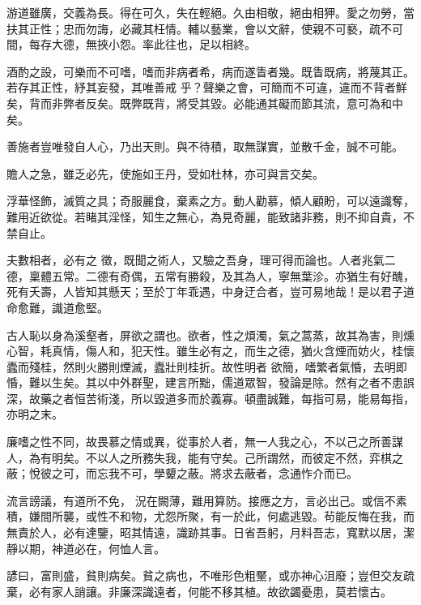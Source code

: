 \begin{pinyinscope}
 游道雖廣，交義為長。得在可久，失在輕絕。久由相敬，絕由相狎。愛之勿勞，當扶其正性；忠而勿誨，必藏其枉情。輔以藝業，會以文辭，使親不可褻，疏不可間，每存大德，無挾小怨。率此往也，足以相終。



 酒酌之設，可樂而不可嗜，嗜而非病者希，病而遂眚者幾。既眚既病，將蔑其正。若存其正性，紓其妄發，其唯善戒
 乎？聲樂之會，可簡而不可違，違而不背者鮮矣，背而非弊者反矣。既弊既背，將受其毀。必能通其礙而節其流，意可為和中矣。



 善施者豈唯發自人心，乃出天則。與不待積，取無謀實，並散千金，誠不可能。



 贍人之急，雖乏必先，使施如王丹，受如杜林，亦可與言交矣。



 浮華怪飾，滅質之具；奇服麗食，棄素之方。動人勸慕，傾人顧盼，可以遠識奪，難用近欲從。若睹其淫怪，知生之無心，為見奇麗，能致諸非務，則不抑自貴，不禁自止。



 夫數相者，必有之
 徵，既聞之術人，又驗之吾身，理可得而論也。人者兆氣二德，稟體五常。二德有奇偶，五常有勝殺，及其為人，寧無葉沴。亦猶生有好醜，死有夭壽，人皆知其懸天；至於丁年乖遇，中身迂合者，豈可易地哉！是以君子道命愈難，識道愈堅。



 古人恥以身為溪壑者，屏欲之謂也。欲者，性之煩濁，氣之蒿蒸，故其為害，則燻心智，耗真情，傷人和，犯天性。雖生必有之，而生之德，猶火含煙而妨火，桂懷蠹而殘桂，然則火勝則煙滅，蠹壯則桂折。故性明者
 欲簡，嗜繁者氣惛，去明即惛，難以生矣。其以中外群聖，建言所黜，儒道眾智，發論是除。然有之者不患誤深，故藥之者恒苦術淺，所以毀道多而於義寡。頓盡誠難，每指可易，能易每指，亦明之末。



 廉嗜之性不同，故畏慕之情或異，從事於人者，無一人我之心，不以己之所善謀人，為有明矣。不以人之所務失我，能有守矣。己所謂然，而彼定不然，弈棋之蔽；悅彼之可，而忘我不可，學顰之蔽。將求去蔽者，念通怍介而已。



 流言謗議，有道所不免，
 況在闕薄，難用算防。接應之方，言必出己。或信不素積，嫌間所襲，或性不和物，尤怨所聚，有一於此，何處逃毀。茍能反悔在我，而無責於人，必有達鑒，昭其情遠，識跡其事。日省吾躬，月料吾志，寬默以居，潔靜以期，神道必在，何恤人言。



 諺曰，富則盛，貧則病矣。貧之病也，不唯形色粗黶，或亦神心沮廢；豈但交友疏棄，必有家人誚讓。非廉深識遠者，何能不移其植。故欲蠲憂患，莫若懷古。




\end{pinyinscope}
